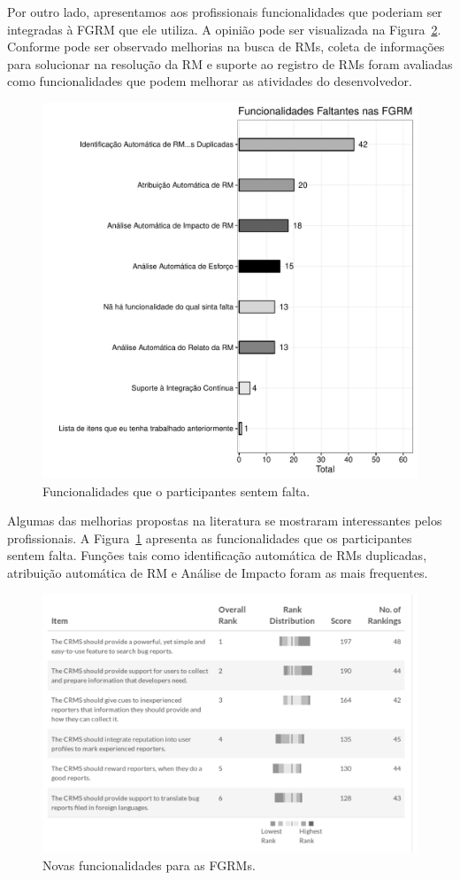 Por outro lado, apresentamos aos profissionais funcionalidades que poderiam ser
integradas à FGRM que ele utiliza. A opinião pode ser visualizada na
Figura~\ref{fig:ggrafico_melhorias_fgrm_melhorias}. Conforme pode ser observado
melhorias na busca de RMs, coleta de informações para solucionar na resolução da
RM e suporte ao registro de RMs foram avaliadas como funcionalidades que podem
melhorar as atividades do desenvolvedor.

\begin{figure}[htpb]
	\centering
	\includegraphics[width=0.6\linewidth]{./chapter-pesquisa-com-profissionais/img/grafico_melhorias_fgrm_funcionalidades_faltantes.pdf}
	\caption{Funcionalidades que o participantes sentem falta.}
\label{fig:grafico_melhorias_fgrm_funcionalidades_falantes}
\end{figure}

Algumas das melhorias propostas na literatura se mostraram interessantes pelos
profissionais. A
Figura~\ref{fig:grafico_melhorias_fgrm_funcionalidades_falantes} apresenta as
funcionalidades que os participantes sentem falta. Funções tais como
identificação automática de RMs duplicadas, atribuição automática de RM e
Análise de Impacto foram as mais frequentes.

\begin{figure}[htpb]
	\centering
	\includegraphics[width=0.6\linewidth]{./chapter-pesquisa-com-profissionais/img/grafico_melhorias_fgrm_melhorias.pdf}
	\caption{Novas funcionalidades para as FGRMs.}
\label{fig:ggrafico_melhorias_fgrm_melhorias}
\end{figure}

